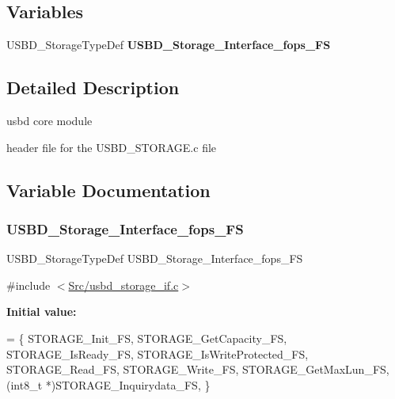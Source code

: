 \subsection*{Variables}
\begin{DoxyCompactItemize}
\item 
U\+S\+B\+D\+\_\+\+Storage\+Type\+Def {\bfseries U\+S\+B\+D\+\_\+\+Storage\+\_\+\+Interface\+\_\+fops\+\_\+\+FS}
\end{DoxyCompactItemize}


\subsection{Detailed Description}
usbd core module 

header file for the U\+S\+B\+D\+\_\+\+S\+T\+O\+R\+A\+G\+E.\+c file

\subsection{Variable Documentation}
\mbox{\label{group___u_s_b_d___s_t_o_r_a_g_e_ga559332062eab5aabc747bc21e919c4b3}} 
\subsubsection{\texorpdfstring{U\+S\+B\+D\+\_\+\+Storage\+\_\+\+Interface\+\_\+fops\+\_\+\+FS}{USBD\_Storage\_Interface\_fops\_FS}}
{\footnotesize\ttfamily U\+S\+B\+D\+\_\+\+Storage\+Type\+Def U\+S\+B\+D\+\_\+\+Storage\+\_\+\+Interface\+\_\+fops\+\_\+\+FS}



{\ttfamily \#include $<$\mbox{\hyperlink{usbd__storage__if_8c}{Src/usbd\+\_\+storage\+\_\+if.\+c}}$>$}

{\bfseries Initial value\+:}
\begin{DoxyCode}
=
\{
  STORAGE\_Init\_FS,
  STORAGE\_GetCapacity\_FS,
  STORAGE\_IsReady\_FS,
  STORAGE\_IsWriteProtected\_FS,
  STORAGE\_Read\_FS,
  STORAGE\_Write\_FS,
  STORAGE\_GetMaxLun\_FS,
  (int8\_t *)STORAGE\_Inquirydata\_FS,
\}
\end{DoxyCode}
